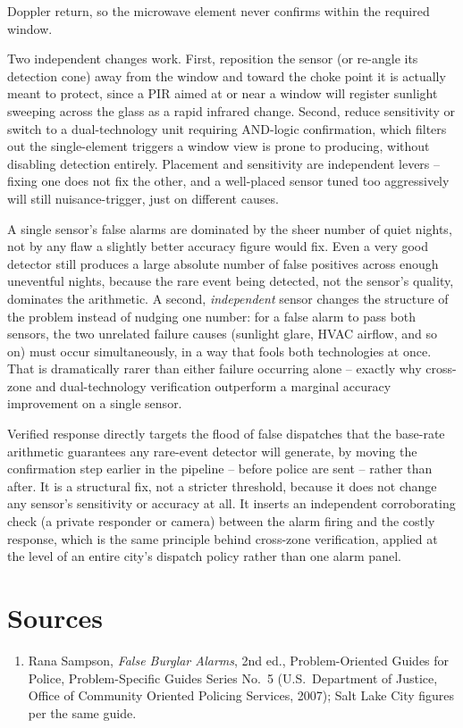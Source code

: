 \begin{answerkey}
Doppler return, so the microwave element never confirms within the required window.
\item Two independent changes work. First, reposition the sensor (or re-angle its detection cone) away from the
window and toward the choke point it is actually meant to protect, since a PIR aimed at or near a
window will register sunlight sweeping across the glass as a rapid infrared change. Second, reduce
sensitivity or switch to a dual-technology unit requiring AND-logic confirmation, which filters out
the single-element triggers a window view is prone to producing, without disabling detection
entirely. Placement and sensitivity are independent levers -- fixing one does not fix the other, and
a well-placed sensor tuned too aggressively will still nuisance-trigger, just on different causes.
\item A single sensor's false alarms are dominated by the sheer number of quiet nights, not by any
flaw a slightly better accuracy figure would fix. Even a very good detector still produces a
large absolute number of false positives across enough uneventful nights, because the rare event
being detected, not the sensor's quality, dominates the arithmetic. A second, \emph{independent}
sensor changes the structure of the problem instead of nudging one number: for a false alarm to
pass both sensors, the two unrelated failure causes (sunlight glare, HVAC airflow, and so on) must
occur simultaneously, in a way that fools both technologies at once. That is dramatically
rarer than either failure occurring alone -- exactly why cross-zone and dual-technology
verification outperform a marginal accuracy improvement on a single sensor.
\item Verified response directly targets the flood of false dispatches that the base-rate
arithmetic guarantees any rare-event detector will generate, by moving the confirmation step
earlier in the pipeline -- before police are sent -- rather than after. It is a structural fix, not
a stricter threshold, because it does not change any sensor's sensitivity or accuracy at all. It
inserts an independent corroborating check (a private responder or camera) between the alarm
firing and the costly response, which is the same principle behind cross-zone verification, applied
at the level of an entire city's dispatch policy rather than one alarm panel.
\end{answerkey}

\section*{Sources}
\begin{enumerate}[label=\lbrack\arabic*\rbrack, leftmargin=2.2em]
\item {}Rana Sampson, \emph{False Burglar Alarms}, 2nd ed., Problem-Oriented Guides
for Police, Problem-Specific Guides Series No.\ 5 (U.S.\ Department of Justice, Office of
Community Oriented Policing Services, 2007); Salt Lake City figures per the same guide.
\end{enumerate}
